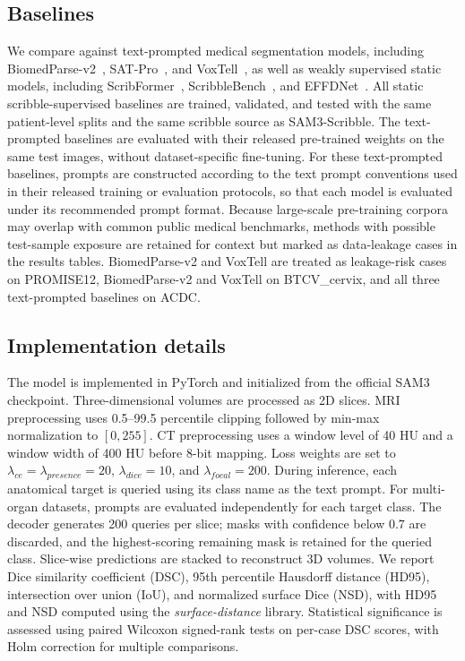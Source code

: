 \documentclass[preprint,12pt]{elsarticle}
\begin{document}
\subsection{Baselines}

We compare against text-prompted medical segmentation models, including BiomedParse-v2~\cite{zhao2025biomedparse,zhao2025boltzmann}, SAT-Pro~\cite{zhao2025sat}, and VoxTell~\cite{rokuss2026voxtell}, as well as weakly supervised static models, including ScribFormer~\cite{li2024ScribFormer}, ScribbleBench~\cite{gotkowski2025scribblebench}, and EFFDNet~\cite{liu2025effdnet}. All static scribble-supervised baselines are trained, validated, and tested with the same patient-level splits and the same scribble source as SAM3-Scribble. The text-prompted baselines are evaluated with their released pre-trained weights on the same test images, without dataset-specific fine-tuning. For these text-prompted baselines, prompts are constructed according to the text prompt conventions used in their released training or evaluation protocols, so that each model is evaluated under its recommended prompt format. Because large-scale pre-training corpora may overlap with common public medical benchmarks, methods with possible test-sample exposure are retained for context but marked as data-leakage cases in the results tables. BiomedParse-v2 and VoxTell are treated as leakage-risk cases on PROMISE12, BiomedParse-v2 and VoxTell on BTCV\_cervix, and all three text-prompted baselines on ACDC.

\subsection{Implementation details}

The model is implemented in PyTorch and initialized from the official SAM3 checkpoint. Three-dimensional volumes are processed as 2D slices. MRI preprocessing uses 0.5--99.5 percentile clipping followed by min-max normalization to $[0,255]$. CT preprocessing uses a window level of 40 HU and a window width of 400 HU before 8-bit mapping. Loss weights are set to $\lambda_{ce}=\lambda_{presence}=20$, $\lambda_{dice}=10$, and $\lambda_{focal}=200$. During inference, each anatomical target is queried using its class name as the text prompt. For multi-organ datasets, prompts are evaluated independently for each target class. The decoder generates 200 queries per slice; masks with confidence below $0.7$ are discarded, and the highest-scoring remaining mask is retained for the queried class. Slice-wise predictions are stacked to reconstruct 3D volumes. We report Dice similarity coefficient (DSC), 95th percentile Hausdorff distance (HD95), intersection over union (IoU), and normalized surface Dice (NSD), with HD95 and NSD computed using the \textit{surface-distance} library. Statistical significance is assessed using paired Wilcoxon signed-rank tests on per-case DSC scores, with Holm correction for multiple comparisons.
\end{document}
